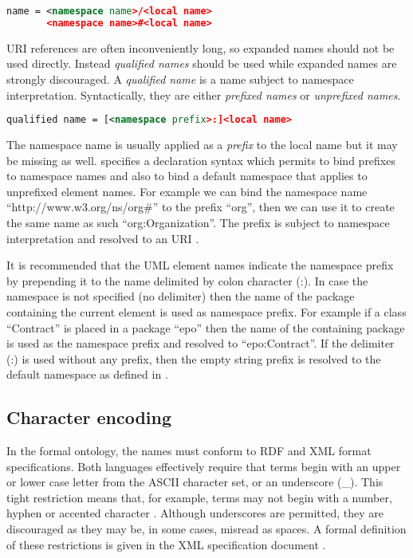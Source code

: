 \begin{lstlisting}[language=XML,frame=none, basicstyle=\footnotesize\ttfamily,breaklines=true]
name = <namespace name>/<local name> 
       <namespace name>#<local name>
\end{lstlisting}
		
	
	URI references are often inconveniently long, so expanded names should not be used directly. Instead \textit{qualified names} should be used while expanded names are strongly discouraged. A \textit{qualified name} is a name subject to namespace interpretation. Syntactically, they are either \textit{prefixed names} or \textit{unprefixed names}.

\begin{lstlisting}[language=XML,frame=none, basicstyle=\footnotesize\ttfamily,breaklines=true]
qualified name = [<namespace prefix>:]<local name>
\end{lstlisting}	
	
	The namespace name is usually applied as a \textit{prefix} to the local name but it may be missing as well. \cite{xml-namespaces} specifies a declaration syntax which permits to bind prefixes to namespace names and also to bind a default namespace that applies to unprefixed element names. For example we can bind the namespace name ``http://www.w3.org/ns/org\#'' to the prefix ``org'', then we can use it to create the same name as such ``org:Organization''. The prefix is subject to namespace interpretation and resolved to an URI \cite{xml-namespaces}.

	It is recommended that the UML element names indicate the namespace prefix by prepending it to the name delimited by colon character (:). In case the namespace is not specified (no delimiter) then the name of the package containing the current element is used as namespace prefix. For example if a class ``Contract'' is placed in a package ``epo'' then the name of the containing package is used as the namespace prefix and resolved to ``epo:Contract''. If the delimiter (:) is used without any prefix, then the empty string prefix is resolved to the default namespace as defined in \citep{xml-namespaces}.

	\subsection{Character encoding}
	\label{sec:charset}
	
	In the formal ontology, the names must conform to RDF \cite{rdf11} and XML\cite{xml1-spec} format specifications. Both languages effectively require that terms begin with an upper or lower case letter from the ASCII character set, or an underscore (\_). This tight restriction means that, for example, terms may not begin with a number, hyphen or accented character \cite{d3.1-2015}. Although underscores are permitted, they are discouraged as they may be, in some cases, misread as spaces. A formal definition of these restrictions is given in the XML specification document \cite{xml1-spec}.
	
